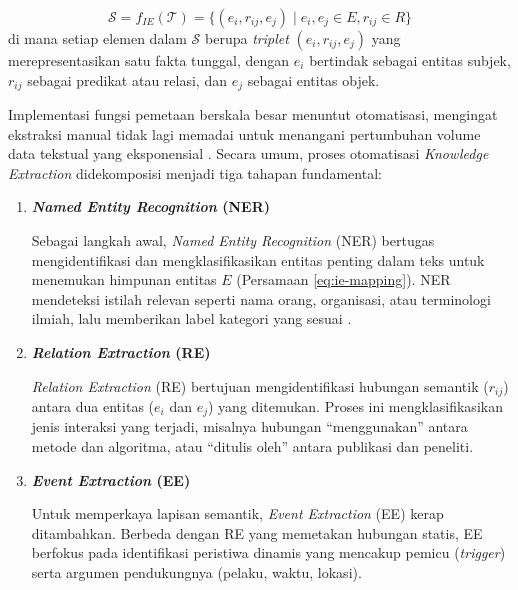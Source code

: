 \begin{equation}
    \mathcal{S} = f_{IE}(\mathcal{T}) = \{(e_i, r_{ij}, e_j) \mid e_i, e_j \in E, r_{ij} \in R\}
    \label{eq:ie-mapping}
\end{equation}
di mana setiap elemen dalam \(\mathcal{S}\) berupa \textit{triplet} \((e_i, r_{ij}, e_j)\) yang merepresentasikan satu fakta tunggal, dengan \(e_i\) bertindak sebagai entitas subjek, \(r_{ij}\) sebagai predikat atau relasi, dan \(e_j\) sebagai entitas objek.

Implementasi fungsi pemetaan berskala besar menuntut otomatisasi, mengingat ekstraksi manual tidak lagi memadai untuk menangani pertumbuhan volume data tekstual yang eksponensial \citep{Premasiri2025}. Secara umum, proses otomatisasi \textit{Knowledge Extraction} didekomposisi menjadi tiga tahapan fundamental:

\begin{enumerate}[label=\textbf{\arabic*.}, leftmargin=*, itemsep=10pt]
    \item \textbf{\textit{Named Entity Recognition} (NER)}

          \hspace*{0.75cm} Sebagai langkah awal, \textit{Named Entity Recognition} (NER) bertugas mengidentifikasi dan mengklasifikasikan entitas penting dalam teks untuk menemukan himpunan entitas \(E\) (Persamaan \ref{eq:ie-mapping}). NER mendeteksi istilah relevan seperti nama orang, organisasi, atau terminologi ilmiah, lalu memberikan label kategori yang sesuai \citep{ZHAO2023225}.

    \item \textbf{\textit{Relation Extraction} (RE)}

          \hspace*{0.75cm} \textit{Relation Extraction} (RE) bertujuan mengidentifikasi hubungan semantik (\(r_{ij}\)) antara dua entitas (\(e_i\) dan \(e_j\)) yang ditemukan. Proses ini mengklasifikasikan jenis interaksi yang terjadi, misalnya hubungan ``menggunakan'' antara metode dan algoritma, atau ``ditulis oleh'' antara publikasi dan peneliti.

    \item \textbf{\textit{Event Extraction} (EE)}

          \hspace*{0.75cm} Untuk memperkaya lapisan semantik, \textit{Event Extraction} (EE) kerap ditambahkan. Berbeda dengan RE yang memetakan hubungan statis, EE berfokus pada identifikasi peristiwa dinamis yang mencakup pemicu (\textit{trigger}) serta argumen pendukungnya (pelaku, waktu, lokasi).

\end{enumerate}

